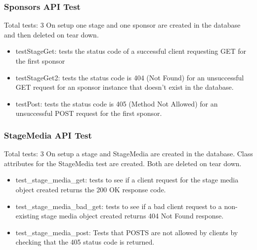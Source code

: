 \documentclass[12pt,english]{scrartcl}
\begin{document}
\subsubsection{Sponsors API Test} 
Total tests: 3
On setup one stage and one sponsor are created in the database and then deleted on tear down.
\begin{itemize}
 \item testStageGet: tests the status code of a successful client requesting GET for the first sponsor
 
 \item testStageGet2: tests the status code is 404 (Not Found) for an unsuccessful GET request for an sponsor instance
 that doesn't exist in the database.
 
 \item testPost: tests the status code is 405 (Method Not Allowed) for an unsuccessful POST request for the first sponsor.
\end{itemize}

\subsubsection{StageMedia API Test} 
Total tests: 3
On setup a stage and StageMedia are created in the database. Class attributes for the StageMedia test are created.
Both are deleted on tear down.
\begin{itemize}
 \item test\_stage\_media\_get: tests to see if a client request for the stage media object created returns the 200 OK response code.
 
 \item test\_stage\_media\_bad\_get: tests to see if a bad client request to a non-existing stage media object created returns 
                                     404 Not Found response.
 
 \item test\_stage\_media\_post: Tests that POSTS are not allowed by clients by checking that the 405 status code is returned.
\end{itemize}
\end{document}
